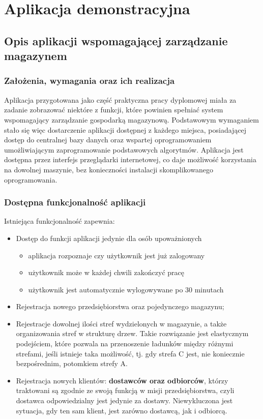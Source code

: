 \chapter{Aplikacja demonstracyjna}
\label{c6:c6}

\section{Opis aplikacji wspomagającej zarządzanie magazynem}
	\subsection{Założenia, wymagania oraz ich realizacja}
		Aplikacja przygotowana jako część praktyczna pracy dyplomowej miała za zadanie
		zobrazować niektóre z funkcji, które powinien spełniać system wspomagający
		zarządzanie gospodarką magazynową. Podstawowym wymaganiem stało się więc
		dostarczenie aplikacji dostępnej z każdego miejsca, posiadającej dostęp
		do centralnej bazy danych oraz wspartej oprogramowaniem umożliwiającym
		zaprogramowanie podstawowych algorytmów. Aplikacja jest dostępna przez interfejs przeglądarki
		internetowej, co daje możliwość korzystania na dowolnej maszynie, bez konieczności
		instalacji skomplikowanego oprogramowania. 
	\subsection{Dostępna funkcjonalność aplikacji}
		Istniejąca funkcjonalność zapewnia:
		\begin{itemize}
			\item Dostęp do funkcji aplikacji jedynie dla osób upoważnionych
			\begin{itemize}
				\item aplikacja rozpoznaje czy użytkownik jest już zalogowany
				\item użytkownik może w każdej chwili zakończyć pracę
				\item użytkownik jest automatycznie wylogowywane po 30 minutach 
			\end{itemize}
			\item Rejestracja nowego przedsiębiorstwa oraz pojedynczego magazynu;
			\item Rejestracje dowolnej ilości stref wydzielonych w magazynie, a także organizowania
			stref w strukturę drzew. Takie rozwiązanie jest elastycznym podejściem, które
			pozwala na przenoszenie ładunków między różnymi strefami, jeśli istnieje taka możliwość, tj.
			gdy strefa C jest, nie koniecznie bezpośrednim, potomkiem strefy A.
			\item Rejestracja nowych klientów: \textbf{dostawców oraz odbiorców}, którzy traktowani są
			zgodnie ze swoją funkcją w misji przedsiębiorstwa, czyli dostawca odpowiedzialny jest
			jedynie za dostawy. Niewykluczona jest sytuacja, gdy ten sam klient, jest zarówno dostawcą, jak
			i odbiorcą. 
		\end{itemize}
